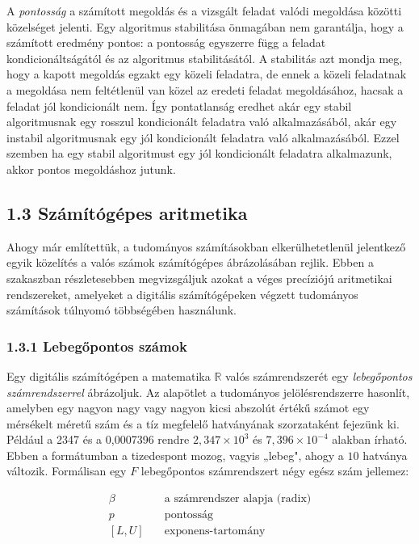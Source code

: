 \documentclass[
  magyar,
  11pt]{article}
\begin{document}
A \emph{pontosság} a számított megoldás és a vizsgált feladat valódi
megoldása közötti közelséget jelenti. Egy algoritmus stabilitása
önmagában nem garantálja, hogy a számított eredmény pontos: a pontosság
egyszerre függ a feladat kondicionáltságától és az algoritmus
stabilitásától. A stabilitás azt mondja meg, hogy a kapott megoldás
egzakt egy közeli feladatra, de ennek a közeli feladatnak a megoldása
nem feltétlenül van közel az eredeti feladat megoldásához, hacsak a
feladat jól kondicionált nem. Így pontatlanság eredhet akár egy stabil
algoritmusnak egy rosszul kondicionált feladatra való alkalmazásából,
akár egy instabil algoritmusnak egy jól kondicionált feladatra való
alkalmazásából. Ezzel szemben ha egy stabil algoritmust egy jól
kondicionált feladatra alkalmazunk, akkor pontos megoldáshoz jutunk.

\subsection{1.3 Számítógépes
aritmetika}\label{szuxe1muxedtuxf3guxe9pes-aritmetika}

Ahogy már említettük, a tudományos számításokban elkerülhetetlenül
jelentkező egyik közelítés a valós számok számítógépes ábrázolásában
rejlik. Ebben a szakaszban részletesebben megvizsgáljuk azokat a véges
precíziójú aritmetikai rendszereket, amelyeket a digitális
számítógépeken végzett tudományos számítások túlnyomó többségében
használunk.

\subsubsection{1.3.1 Lebegőpontos
számok}\label{lebegux151pontos-szuxe1mok}

Egy digitális számítógépen a matematika \(\mathbb{R}\) valós
számrendszerét egy \emph{lebegőpontos számrendszerrel} ábrázoljuk. Az
alapötlet a tudományos jelölésrendszerre hasonlít, amelyben egy nagyon
nagy vagy nagyon kicsi abszolút értékű számot egy mérsékelt méretű szám
és a tíz megfelelő hatványának szorzataként fejezünk ki. Például a 2347
és a 0,0007396 rendre \(2{,}347 \times 10^3\) és
\(7{,}396 \times 10^{-4}\) alakban írható. Ebben a formátumban a
tizedespont mozog, vagyis „lebeg", ahogy a \(10\) hatványa változik.
Formálisan egy \(F\) lebegőpontos számrendszert négy egész szám
jellemez:

\[\begin{aligned}
\beta &\quad \text{a számrendszer alapja (radix)}\\
p &\quad \text{pontosság}\\
[L, U] &\quad \text{exponens-tartomány}
\end{aligned}\]
\end{document}
